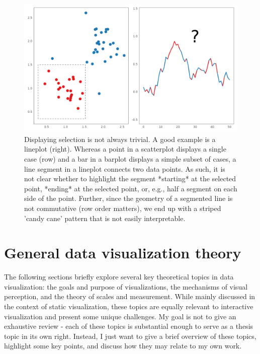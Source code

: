 \documentclass[
]{book}
\begin{document}
\begin{figure}

{\centering \includegraphics[width=20.83in]{./figures/line-consistency} 

}

\caption{Displaying selection is not always trivial. A good example is a lineplot (right). Whereas a point in a scatterplot displays a single case (row) and a bar in a barplot displays a simple subset of cases, a line segment in a lineplot connects two data points. As such, it is not clear whether to highlight the segment *starting* at the selected point, *ending* at the selected point, or, e.g., half a segment on each side of the point. Further, since the geometry of a segmented line is not commutative (row order matters), we end up with a striped 'candy cane' pattern that is not easily interpretable.}\label{fig:line-consistency}
\end{figure}

\section{General data visualization theory}\label{general-data-visualization-theory}

The following sections briefly explore several key theoretical topics in data visualization: the goals and purpose of visualizations, the mechanisms of visual perception, and the theory of scales and measurement. While mainly discussed in the context of static visualization, these topics are equally relevant to interactive visualization and present some unique challenges. My goal is not to give an exhaustive review - each of these topics is substantial enough to serve as a thesis topic in its own right. Instead, I just want to give a brief overview of these topics, highlight some key points, and discuss how they may relate to my own work.
\end{document}
